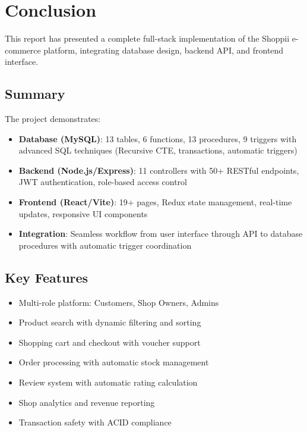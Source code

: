 \section{Conclusion}

This report has presented a complete full-stack implementation of the Shoppii e-commerce platform, integrating database design, backend API, and frontend interface.

\subsection{Summary}

The project demonstrates:

\begin{itemize}
    \item \textbf{Database (MySQL)}: 13 tables, 6 functions, 13 procedures, 9 triggers with advanced SQL techniques (Recursive CTE, transactions, automatic triggers)
    \item \textbf{Backend (Node.js/Express)}: 11 controllers with 50+ RESTful endpoints, JWT authentication, role-based access control
    \item \textbf{Frontend (React/Vite)}: 19+ pages, Redux state management, real-time updates, responsive UI components
    \item \textbf{Integration}: Seamless workflow from user interface through API to database procedures with automatic trigger coordination
\end{itemize}

\subsection{Key Features}

\begin{itemize}
    \item Multi-role platform: Customers, Shop Owners, Admins
    \item Product search with dynamic filtering and sorting
    \item Shopping cart and checkout with voucher support
    \item Order processing with automatic stock management
    \item Review system with automatic rating calculation
    \item Shop analytics and revenue reporting
    \item Transaction safety with ACID compliance
\end{itemize}